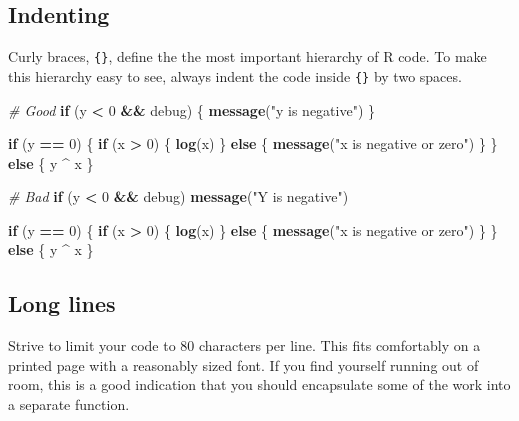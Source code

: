 \documentclass[]{book}
\newenvironment{Shaded}{\begin{snugshade}}{\end{snugshade}}
\newcommand{\KeywordTok}[1]{\textcolor[rgb]{0.13,0.29,0.53}{\textbf{#1}}}
\newcommand{\DecValTok}[1]{\textcolor[rgb]{0.00,0.00,0.81}{#1}}
\newcommand{\StringTok}[1]{\textcolor[rgb]{0.31,0.60,0.02}{#1}}
\newcommand{\CommentTok}[1]{\textcolor[rgb]{0.56,0.35,0.01}{\textit{#1}}}
\newcommand{\ControlFlowTok}[1]{\textcolor[rgb]{0.13,0.29,0.53}{\textbf{#1}}}
\newcommand{\OperatorTok}[1]{\textcolor[rgb]{0.81,0.36,0.00}{\textbf{#1}}}
\newcommand{\NormalTok}[1]{#1}
\theoremstyle{definition}
\theoremstyle{definition}
\theoremstyle{definition}
\theoremstyle{remark}
\begin{document}
\subsection{Indenting}\label{indenting}

Curly braces, \texttt{\{\}}, define the the most important hierarchy of
R code. To make this hierarchy easy to see, always indent the code
inside \texttt{\{\}} by two spaces.

\begin{Shaded}
\begin{Highlighting}[]
\CommentTok{# Good}
\ControlFlowTok{if}\NormalTok{ (y }\OperatorTok{<}\StringTok{ }\DecValTok{0} \OperatorTok{&&}\StringTok{ }\NormalTok{debug) \{}
  \KeywordTok{message}\NormalTok{(}\StringTok{"y is negative"}\NormalTok{)}
\NormalTok{\}}

\ControlFlowTok{if}\NormalTok{ (y }\OperatorTok{==}\StringTok{ }\DecValTok{0}\NormalTok{) \{}
  \ControlFlowTok{if}\NormalTok{ (x }\OperatorTok{>}\StringTok{ }\DecValTok{0}\NormalTok{) \{}
    \KeywordTok{log}\NormalTok{(x)}
\NormalTok{  \} }\ControlFlowTok{else}\NormalTok{ \{}
    \KeywordTok{message}\NormalTok{(}\StringTok{"x is negative or zero"}\NormalTok{)}
\NormalTok{  \}}
\NormalTok{\} }\ControlFlowTok{else}\NormalTok{ \{}
\NormalTok{  y }\OperatorTok{^}\StringTok{ }\NormalTok{x}
\NormalTok{\}}

\CommentTok{# Bad}
\ControlFlowTok{if}\NormalTok{ (y }\OperatorTok{<}\StringTok{ }\DecValTok{0} \OperatorTok{&&}\StringTok{ }\NormalTok{debug)}
\KeywordTok{message}\NormalTok{(}\StringTok{"Y is negative"}\NormalTok{)}

\ControlFlowTok{if}\NormalTok{ (y }\OperatorTok{==}\StringTok{ }\DecValTok{0}\NormalTok{)}
\NormalTok{\{}
    \ControlFlowTok{if}\NormalTok{ (x }\OperatorTok{>}\StringTok{ }\DecValTok{0}\NormalTok{) \{}
      \KeywordTok{log}\NormalTok{(x)}
\NormalTok{    \} }\ControlFlowTok{else}\NormalTok{ \{}
  \KeywordTok{message}\NormalTok{(}\StringTok{"x is negative or zero"}\NormalTok{)}
\NormalTok{    \}}
\NormalTok{\} }\ControlFlowTok{else}\NormalTok{ \{ y }\OperatorTok{^}\StringTok{ }\NormalTok{x \}}
\end{Highlighting}
\end{Shaded}

\subsection{Long lines}\label{long-lines}

Strive to limit your code to 80 characters per line. This fits
comfortably on a printed page with a reasonably sized font. If you find
yourself running out of room, this is a good indication that you should
encapsulate some of the work into a separate function.
\end{document}
